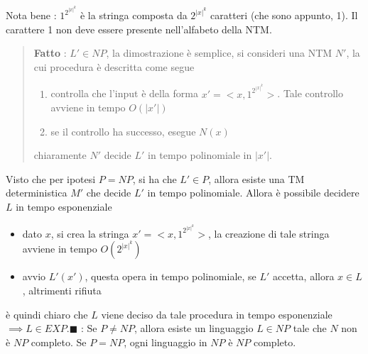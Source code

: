 \documentclass[10pt, letterpaper]{report}
\begin{document}
Nota bene : $1^{2^{|x|^k}}$ è la stringa composta da ${2^{|x|^k}}$ caratteri (che sono appunto, 1). Il carattere 1 non deve essere presente nell'alfabeto della NTM.
\begin{quote}
    \textbf{Fatto} : $L'\in NP$, la dimostrazione è semplice, si consideri una NTM $N'$, la cui procedura è descritta come segue\begin{enumerate}
        \item controlla che l'input è della forma $x'=<x,1^{2^{|x|^k}}>$. Tale controllo avviene in tempo $O(|x'|)$ 
        \item se il controllo ha successo, esegue $N(x)$
    \end{enumerate}
    chiaramente $N'$ decide $L'$ in tempo polinomiale in $|x'|$.
\end{quote}
Visto che per ipotesi $P=NP$, si ha che $L'\in P$, allora esiste una TM deterministica $M'$ che decide $L'$ in tempo polinomiale. Allora è possibile decidere $L$ in tempo esponenziale\begin{itemize}
    \item dato $x$, si crea la stringa $x'=<x,1^{2^{|x|^k}}>$, la creazione di tale stringa avviene in tempo $O(2^{|x|^k})$ 
    \item avvio $L'(x')$, questa opera in tempo polinomiale, se $L'$ accetta, allora $x\in L$, altrimenti rifiuta 
\end{itemize}
è quindi chiaro che $L$ viene deciso da tale procedura in tempo esponenziale $\implies L\in EXP$.\hfill$\blacksquare$\acc   
{} : Se $P\ne NP$, allora esiste un linguaggio $L\in NP$ tale che $N$ non è $NP$ completo. Se $P=NP$, ogni linguaggio in $NP$ è $NP$ completo. 
\flowerLine
\end{document}
